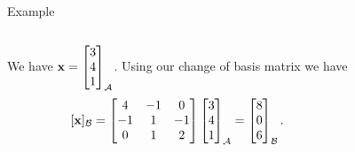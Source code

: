\documentclass[xcolor=dvipsnames,aspectratio=169,t]{beamer}
\begin{document}
\begin{frame}{Example}
\begin{columns}[T]
\pause
\alert{We have $\mathbf{x} = \begin{bmatrix} 3 \\ 4 \\ 1 \end{bmatrix}_{\mathcal{A}}$. Using our change of basis matrix we have
\[ \lbrack \mathbf{x} \rbrack_{\mathcal{B}} = \begin{bmatrix} 4 & -1 & 0 \\ -1 & 1 & -1 \\ 0 & 1 & 2 \end{bmatrix} \begin{bmatrix} 3 \\ 4 \\ 1 \end{bmatrix}_{\mathcal{A}} = \begin{bmatrix} 8 \\ 0 \\ 6 \end{bmatrix}_{\mathcal{B}} .\]}

\end{columns}
\end{frame}
\end{document}
